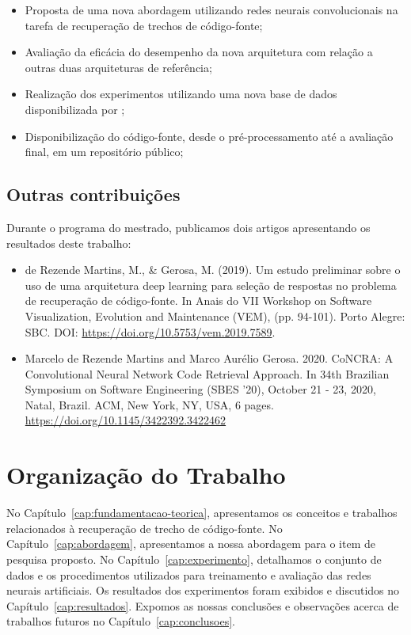 \begin{itemize}
\item Proposta de uma nova abordagem utilizando redes neurais convolucionais na tarefa de recuperação de trechos de código-fonte;
\item Avaliação da eficácia do desempenho da nova arquitetura com relação a outras duas arquiteturas de referência;
\item Realização dos experimentos utilizando uma nova base de dados disponibilizada por \cite{yao-2018};
\item Disponibilização do código-fonte, desde o pré-processamento até a avaliação final, em um repositório público;
\end{itemize}

\subsection{Outras contribuições}

Durante o programa do mestrado, publicamos dois artigos apresentando os resultados deste trabalho:

\begin{itemize}
    \item de Rezende Martins, M., \& Gerosa, M. (2019). Um estudo preliminar sobre o uso de uma arquitetura deep learning para seleção de respostas no problema de recuperação de código-fonte. In Anais do VII Workshop on Software Visualization, Evolution and Maintenance (VEM), (pp. 94-101). Porto Alegre: SBC. DOI: \url{https://doi.org/10.5753/vem.2019.7589}.
    \item Marcelo de Rezende Martins and Marco Aurélio Gerosa. 2020. CoNCRA: A Convolutional Neural Network Code Retrieval Approach. In 34th Brazilian Symposium on Software Engineering (SBES ’20), October 21 - 23, 2020, Natal, Brazil. ACM, New York, NY, USA, 6 pages. \url{https://doi.org/10.1145/3422392.3422462}
\end{itemize}


\section{Organização do Trabalho}
\label{sec:organizacao_trabalho}

No Capítulo~\ref{cap:fundamentacao-teorica}, apresentamos os conceitos e trabalhos relacionados à recuperação de trecho de código-fonte. No Capítulo~\ref{cap:abordagem}, apresentamos a nossa abordagem para o item de pesquisa proposto. No Capítulo~\ref{cap:experimento}, detalhamos o conjunto de dados e os procedimentos utilizados para treinamento e avaliação das redes neurais artificiais. Os resultados dos experimentos foram exibidos e discutidos no Capítulo~\ref{cap:resultados}. Expomos as nossas conclusões e observações acerca de trabalhos futuros no Capítulo~\ref{cap:conclusoes}.